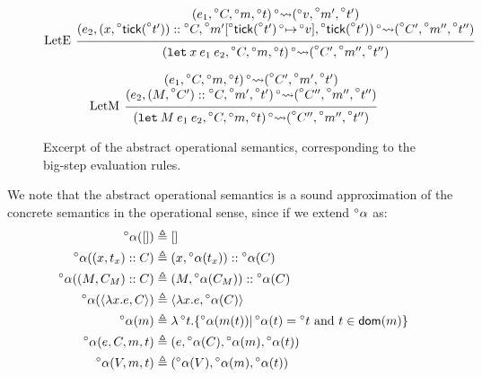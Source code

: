 \documentclass[acmsmall,review]{acmart}\settopmatter{printfolios=true,printccs=false,printacmref=false}
\theoremstyle{definition}
\theoremstyle{plain}
\newcommand*{\cons}{::}
\newcommand*{\A}[1]{\prescript{\circ}{}{#1}}
\newcommand*{\mem}{m}
\newcommand*{\semarrow}{\rightsquigarrow}
\newcommand*{\tick}{\mathsf{tick}}
\begin{document}
\begin{figure}[h!]
  \[
    \begin{prooftree}
      \hypo{
        \begin{matrix}
          (e_{1}, \A{C}, \A\mem, \A{t})
          \A\semarrow
          (\A{v}, \A{\mem'}, \A{t'}) \\
          (e_{2}, (x, \A\tick(\A{t'}))\cons \A{C}, \A{\mem'}[\A\tick(\A{t'})\A\mapsto \A{v}], \A\tick(\A{t'}))
          \A\semarrow
          (\A{C'}, \A{\mem''}, \A{t''})
        \end{matrix}
      }
      \infer[left label=LetE]1{
      (\mathtt{let}\:x\:e_1\:e_2, \A{C}, \A\mem, \A{t})
      \A\semarrow
      (\A{C'}, \A{\mem''}, \A{t''})
      }
    \end{prooftree}
  \]

  \[
    \begin{prooftree}
      \hypo{
        \begin{matrix}
          (e_{1}, \A{C}, \A\mem, \A{t})
          \A\semarrow
          (\A{C'}, \A{\mem'}, \A{t'}) \\
          (e_{2}, (M, \A{C'})\cons \A{C}, \A{\mem'}, \A{t'})
          \A\semarrow
          (\A{C''}, \A{\mem''}, \A{t''})
        \end{matrix}
      }
      \infer[left label=LetM]1{
      (\mathtt{let}\:M\:e_{1}\:e_{2}, \A{C}, \A\mem, \A{t})
      \A\semarrow
      (\A{C''}, \A{\mem''}, \A{t''})
      }
    \end{prooftree}
  \]
  \caption{Excerpt of the abstract operational semantics, corresponding to the big-step evaluation rules.}
  \label{fig:absreach}
\end{figure}
We note that the abstract operational semantics is a sound approximation of the concrete semantics in the operational sense, since if we extend $\A\alpha$ as:
\begin{align*}
  \A\alpha([])                          & \triangleq []                                                                                    \\
  \A\alpha((x,t_x)\cons C)              & \triangleq(x,\A\alpha(t_x))\cons\A\alpha(C)                                                      \\
  \A\alpha((M,C_M)\cons C)              & \triangleq(M,\A\alpha(C_M))\cons\A\alpha(C)                                                      \\
  \A\alpha(\langle\lambda x.e,C\rangle) & \triangleq\langle\lambda x.e,\A\alpha(C)\rangle                                                  \\
  \A\alpha(\mem)                        & \triangleq\lambda\A{t}.\{\A\alpha(\mem(t))|\A\alpha(t)=\A{t}\text{ and }t\in\mathsf{dom}(\mem)\} \\
  \A\alpha(e,C,\mem,t)                  & \triangleq(e,\A\alpha(C),\A\alpha(\mem),\A\alpha(t))                                             \\
  \A\alpha(V,\mem,t)                    & \triangleq(\A\alpha(V),\A\alpha(\mem),\A\alpha(t))
\end{align*}
\end{document}
